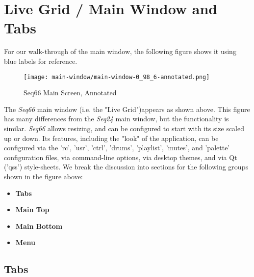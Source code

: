 %
%
%

\section{Live Grid / Main Window and Tabs}
\label{sec:live_grid}

   For our walk-through of the main window, the following figure
   shows it using blue labels for reference.

\begin{figure}[H]
   \centering 
   \texttt{[image: main-window/main-window-0\_98\_6-annotated.png]}
   \caption{Seq66 Main Screen, Annotated}
   \label{fig:main_screen_annotated}
\end{figure}

   The \textsl{Seq66} main window (i.e. the "Live Grid")appears as shown above.
   This figure has many differences from the \textsl{Seq24} main window,
   but the functionality is similar.
   \textsl{Seq66} allows resizing, and can
   be configured to start with its size scaled up or down.
   Its features, including the "look" of the application,
   can be configured via the 'rc', 'usr', 'ctrl', 'drums', 'playlist', 'mutes',
   and 'palette' configuration files, via command-line options, via
   desktop themes, and via Qt ('qss') style-sheets.
   We break the discussion into sections for the following
   groups shown in the figure above:

   \begin{itemize}
      \item \textbf{Tabs}
      \item \textbf{Main Top}
      \item \textbf{Main Bottom}
      \item \textbf{Menu}
   \end{itemize}

\subsection{Tabs}
\label{subsec:introduction_main_tabs}

